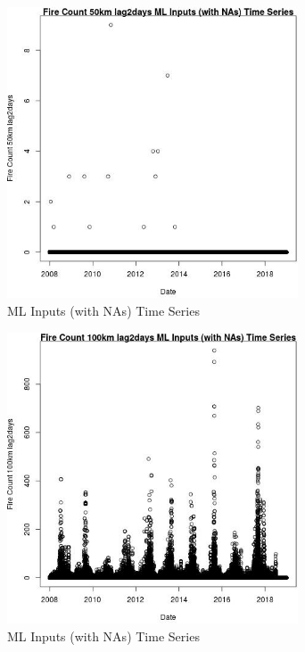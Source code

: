 \begin{figure} 
\centering  
\includegraphics[width=0.77\textwidth]{Code_Outputs/Report_ML_input_PM25_Step4_part_e_de_duplicated_aves_compiled_2019-05-21wNAs_Fire_Count_50km_lag2daysvDate.jpg} 
\caption{\label{fig:Report_ML_input_PM25_Step4_part_e_de_duplicated_aves_compiled_2019-05-21wNAsFire_Count_50km_lag2daysvDate}ML Inputs (with NAs) Time Series} 
\end{figure} 
 

\begin{figure} 
\centering  
\includegraphics[width=0.77\textwidth]{Code_Outputs/Report_ML_input_PM25_Step4_part_e_de_duplicated_aves_compiled_2019-05-21wNAs_Fire_Count_100km_lag2daysvDate.jpg} 
\caption{\label{fig:Report_ML_input_PM25_Step4_part_e_de_duplicated_aves_compiled_2019-05-21wNAsFire_Count_100km_lag2daysvDate}ML Inputs (with NAs) Time Series} 
\end{figure} 
 

